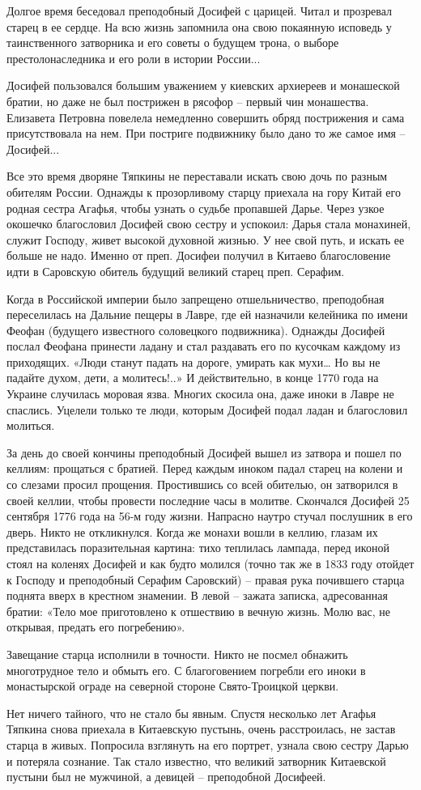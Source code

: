 Долгое время беседовал преподобный Досифей с царицей. Читал и прозревал старец
в ее сердце. На всю жизнь запомнила она свою покаянную исповедь у таинственного
затворника и его советы о будущем трона, о выборе престолонаследника и его роли
в истории России...

Досифей пользовался большим уважением у киевских архиереев и монашеской братии,
но даже не был пострижен в рясофор – первый чин монашества. Елизавета Петровна
повелела немедленно совершить обряд пострижения и сама присутствовала на нем.
При постриге подвижнику было дано то же самое имя – Досифей...

Все это время дворяне Тяпкины не переставали искать свою дочь по разным
обителям России. Однажды к прозорливому старцу приехала на гору Китай его
родная сестра Агафья, чтобы узнать о судьбе пропавшей Дарье. Через узкое
окошечко благословил Досифей свою сестру и успокоил: Дарья стала монахиней,
служит Господу, живет высокой духовной жизнью. У нее свой путь, и искать ее
больше не надо. Именно от преп. Досифеи получил в Китаево благословение идти в
Саровскую обитель будущий великий старец преп. Серафим.

Когда в Российской империи было запрещено отшельничество, преподобная
переселилась на Дальние пещеры в Лавре, где ей назначили келейника по имени
Феофан (будущего известного соловецкого подвижника). Однажды Досифей послал
Феофана принести ладану и стал раздавать его по кусочкам каждому из приходящих.
«Люди станут падать на дороге, умирать как мухи… Но вы не падайте духом, дети,
а молитесь!..» И действительно, в конце 1770 года на Украине случилась моровая
язва. Многих скосила она, даже иноки в Лавре не спаслись. Уцелели только те
люди, которым Досифей подал ладан и благословил молиться.

За день до своей кончины преподобный Досифей вышел из затвора и пошел по
келлиям: прощаться с братией. Перед каждым иноком падал старец на колени и со
слезами просил прощения. Простившись со всей обителью, он затворился в своей
келлии, чтобы провести последние часы в молитве. Скончался Досифей 25 сентября
1776 года на 56-м году жизни. Напрасно наутро стучал послушник в его дверь.
Никто не откликнулся. Когда же монахи вошли в келлию, глазам их представилась
поразительная картина: тихо теплилась лампада, перед иконой стоял на коленях
Досифей и как будто молился (точно так же в 1833 году отойдет к Господу и
преподобный Серафим Саровский) – правая рука почившего старца поднята вверх в
крестном знамении. В левой – зажата записка, адресованная братии: «Тело мое
приготовлено к отшествию в вечную жизнь. Молю вас, не открывая, предать его
погребению».

Завещание старца исполнили в точности. Никто не посмел обнажить многотрудное
тело и обмыть его. С благоговением погребли его иноки в монастырской ограде на
северной стороне Свято-Троицкой церкви.

Нет ничего тайного, что не стало бы явным. Спустя несколько лет Агафья Тяпкина
снова приехала в Китаевскую пустынь, очень расстроилась, не застав старца в
живых. Попросила взглянуть на его портрет, узнала свою сестру Дарью и потеряла
сознание. Так стало известно, что великий затворник Китаевской пустыни был не
мужчиной, а девицей – преподобной Досифеей.
